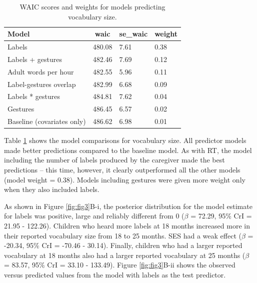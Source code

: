 \documentclass[
  english,
  man,floatsintext]{apa6}
\begin{document}
\begin{table}[tbp]

\begin{center}
\begin{threeparttable}

\caption{\label{tab:tab2}WAIC scores and weights for models predicting vocabulary size.}

\begin{tabular}{llll}
\toprule
Model & \multicolumn{1}{c}{waic} & \multicolumn{1}{c}{se\_waic} & \multicolumn{1}{c}{weight}\\
\midrule
Labels & 480.08 & 7.61 & 0.38\\
Labels + gestures & 482.46 & 7.69 & 0.12\\
Adult words per hour & 482.55 & 5.96 & 0.11\\
Label-gestures overlap & 482.99 & 6.68 & 0.09\\
Labels * gestures & 484.81 & 7.62 & 0.04\\
Gestures & 486.45 & 6.57 & 0.02\\
Baseline (covariates only) & 486.62 & 6.98 & 0.01\\
\bottomrule
\end{tabular}

\end{threeparttable}
\end{center}

\end{table}

Table \ref{tab:tab2} shows the model comparisons for vocabulary size. All predictor models made better predictions compared to the baseline model. As with RT, the model including the number of labels produced by the caregiver made the best predictions -- this time, however, it clearly outperformed all the other models (model weight = 0.38). Models including gestures were given more weight only when they also included labels.

As shown in Figure \ref{fig:fig3}B-i, the posterior distribution for the model estimate for labels was positive, large and reliably different from 0 (\(\beta\) = 72.29, 95\% CrI = 21.95 - 122.26). Children who heard more labels at 18 months increased more in their reported vocabulary size from 18 to 25 months. SES had a weak effect (\(\beta\) = -20.34, 95\% CrI = -70.46 - 30.14). Finally, children who had a larger reported vocabulary at 18 months also had a larger reported vocabulary at 25 months (\(\beta\) = 83.57, 95\% CrI = 33.10 - 133.49). Figure \ref{fig:fig3}B-ii shows the observed versus predicted values from the model with labels as the test predictor.
\end{document}
